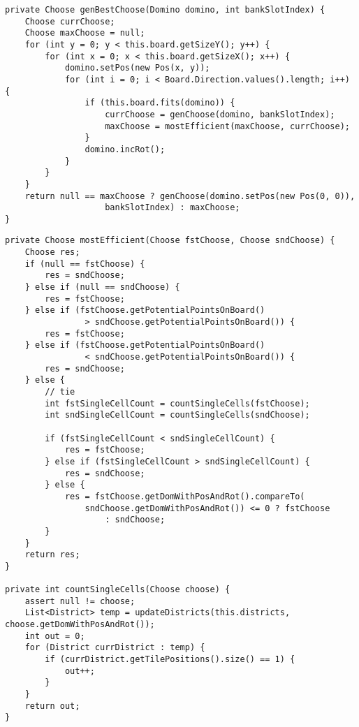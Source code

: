 \begin{lstlisting}[float,style=CodeHighlighting,caption=DefaultAIPlayer - genBestChoose,label=lst:defaultAIPlayer_genBestChoose]
private Choose genBestChoose(Domino domino, int bankSlotIndex) {
    Choose currChoose;
    Choose maxChoose = null;
    for (int y = 0; y < this.board.getSizeY(); y++) {
        for (int x = 0; x < this.board.getSizeX(); x++) {
            domino.setPos(new Pos(x, y));
            for (int i = 0; i < Board.Direction.values().length; i++) {
                if (this.board.fits(domino)) {
                    currChoose = genChoose(domino, bankSlotIndex);
                    maxChoose = mostEfficient(maxChoose, currChoose);
                }
                domino.incRot();
            }
        }
    }
    return null == maxChoose ? genChoose(domino.setPos(new Pos(0, 0)), 
    				bankSlotIndex) : maxChoose;
}
\end{lstlisting}

\begin{lstlisting}[float,style=CodeHighlighting,caption=DefaultAIPlayer - mostEfficient,label=lst:defaultAIPlayer_mostEfficient]
private Choose mostEfficient(Choose fstChoose, Choose sndChoose) {
    Choose res;
    if (null == fstChoose) {
        res = sndChoose;
    } else if (null == sndChoose) {
        res = fstChoose;
    } else if (fstChoose.getPotentialPointsOnBoard() 
    			> sndChoose.getPotentialPointsOnBoard()) {
        res = fstChoose;
    } else if (fstChoose.getPotentialPointsOnBoard() 
    			< sndChoose.getPotentialPointsOnBoard()) {
        res = sndChoose;
    } else {
        // tie
        int fstSingleCellCount = countSingleCells(fstChoose);
        int sndSingleCellCount = countSingleCells(sndChoose);

        if (fstSingleCellCount < sndSingleCellCount) {
            res = fstChoose;
        } else if (fstSingleCellCount > sndSingleCellCount) {
            res = sndChoose;
        } else {
            res = fstChoose.getDomWithPosAndRot().compareTo(
            	sndChoose.getDomWithPosAndRot()) <= 0 ? fstChoose
                    : sndChoose;
        }
    }
    return res;
}

private int countSingleCells(Choose choose) {
    assert null != choose;
    List<District> temp = updateDistricts(this.districts, choose.getDomWithPosAndRot());
    int out = 0;
    for (District currDistrict : temp) {
        if (currDistrict.getTilePositions().size() == 1) {
            out++;
        }
    }
    return out;
}
\end{lstlisting}


